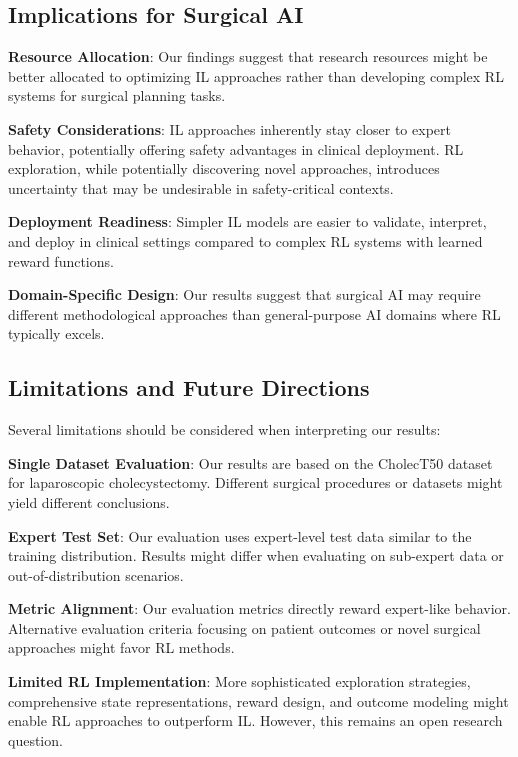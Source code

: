 \documentclass[runningheads]{llncs}
\begin{document}
\subsection{Implications for Surgical AI}

\textbf{Resource Allocation}: Our findings suggest that research resources might be better allocated to optimizing IL approaches rather than developing complex RL systems for surgical planning tasks.

\textbf{Safety Considerations}: IL approaches inherently stay closer to expert behavior, potentially offering safety advantages in clinical deployment. RL exploration, while potentially discovering novel approaches, introduces uncertainty that may be undesirable in safety-critical contexts.

\textbf{Deployment Readiness}: Simpler IL models are easier to validate, interpret, and deploy in clinical settings compared to complex RL systems with learned reward functions.

\textbf{Domain-Specific Design}: Our results suggest that surgical AI may require different methodological approaches than general-purpose AI domains where RL typically excels.

\subsection{Limitations and Future Directions}

Several limitations should be considered when interpreting our results:

\textbf{Single Dataset Evaluation}: Our results are based on the CholecT50 dataset for laparoscopic cholecystectomy. Different surgical procedures or datasets might yield different conclusions.

\textbf{Expert Test Set}: Our evaluation uses expert-level test data similar to the training distribution. Results might differ when evaluating on sub-expert data or out-of-distribution scenarios.

\textbf{Metric Alignment}: Our evaluation metrics directly reward expert-like behavior. Alternative evaluation criteria focusing on patient outcomes or novel surgical approaches might favor RL methods.

\textbf{Limited RL Implementation}: More sophisticated exploration strategies, comprehensive state representations, reward design, and outcome modeling might enable RL approaches to outperform IL. However, this remains an open research question.
\end{document}
